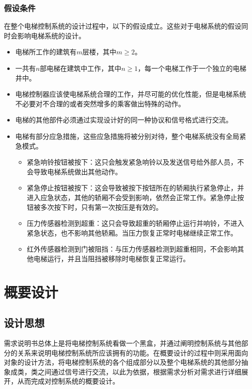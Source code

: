 \subsubsection{假设条件}
在整个电梯控制系统的设计过程中，以下的假设成立。这些对于电梯系统的假设同时会影响电梯系统的设计。\par
\begin{itemize}
	\item 电梯所工作的建筑有$m$层楼，其中$m\geqslant2$。
	\item 一共有$n$部电梯在建筑中工作，其中$n\geqslant1$，每一个电梯工作于一个独立的电梯井中。
	\item 电梯控制器应该使电梯系统合理的工作，并尽可能的优化性能，但是电梯系统不必要对不合理的或者突然增多的乘客做出特殊的动作。
	\item 电梯的其他部件必须通过实现设计好的同一种协议和信号格式进行交流。
	\item 电梯有部分应急措施，这些应急措施将被分别对待，整个电梯系统没有全局紧急模式。
	\begin{itemize}
		\item 紧急响铃按钮被按下：这只会触发紧急响铃以及发送信号给外部人员，不会导致电梯系统做出其他动作。
		\item 紧急停止按钮被按下：这会导致被按下按钮所在的轿厢执行紧急停止，并进入应急状态，其他的轿厢不会受到影响，依然会正常工作。紧急停止按钮被多次按下时，只有第一次按压是有效的。
		\item 压力传感器检测到超重：这只会导致超重的轿厢停止运行并响铃，不进入紧急状态，也不影响其他轿厢。当压力恢复正常时电梯继续正常工作。
		\item 红外传感器检测到门被阻挡：与压力传感器检测到超重相同，不会影响其他电梯运行，并且当阻挡被移除时电梯恢复正常运行。
	\end{itemize}
\end{itemize}

\newpage
\section{概要设计}
\label{sec:overallDesign}
\subsection{设计思想}
需求说明书总体上是将电梯控制系统看做一个黑盒，并通过阐明控制系统与其他部分的关系来说明电梯控制系统所应该拥有的功能。在概要设计的过程中则采用面向对象的设计方法，将电梯控制系统的各个组成部分以及整个电梯系统的其他部分抽象成类，类之间通过信号进行交流，以此为依据，根据需求分析对需求进行详细展开，从而完成对控制系统的概要设计。

